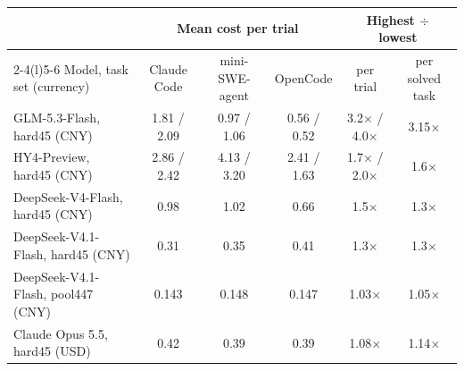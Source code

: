 \footnotesize\setlength{\tabcolsep}{4pt}
\begin{tabular}{@{}lccccc@{}}
\toprule
 & \multicolumn{3}{c}{Mean cost per trial} & \multicolumn{2}{c}{Highest $\div$ lowest} \\
\cmidrule(lr){2-4}\cmidrule(l){5-6}
Model, task set (currency) & Claude Code & mini-SWE-agent & OpenCode & per trial & per solved task \\
\midrule
GLM-5.3-Flash, hard45 (CNY) & 1.81 / 2.09 & 0.97 / 1.06 & 0.56 / 0.52 & 3.2$\times$ / 4.0$\times$ & 3.15$\times$ \\
HY4-Preview, hard45 (CNY) & 2.86 / 2.42 & 4.13 / 3.20 & 2.41 / 1.63 & 1.7$\times$ / 2.0$\times$ & 1.6$\times$ \\
DeepSeek-V4-Flash, hard45 (CNY) & 0.98 & 1.02 & 0.66 & 1.5$\times$ & 1.3$\times$ \\
DeepSeek-V4.1-Flash, hard45 (CNY) & 0.31 & 0.35 & 0.41 & 1.3$\times$ & 1.3$\times$ \\
DeepSeek-V4.1-Flash, pool447 (CNY) & 0.143 & 0.148 & 0.147 & 1.03$\times$ & 1.05$\times$ \\
Claude Opus 5.5, hard45 (USD) & 0.42 & 0.39 & 0.39 & 1.08$\times$ & 1.14$\times$ \\
\bottomrule
\end{tabular}
